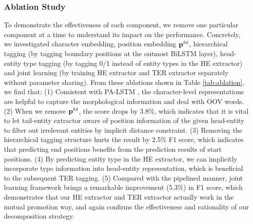 \documentclass{ecai}
\begin{document}
 
 
 \subsubsection{Ablation Study}
 
 

  To demonstrate the effectiveness of each component, we remove one particular component at a time to understand its impact on the performance. Concretely, we investigated character embedding, position embedding $\boldsymbol{\rm{p}}^{ht}$, hierarchical tagging (by tagging boundary positions at the outmost BiLSTM layer), head-entity type tagging (by tagging 0/1 instead of entity types in the HE extractor) and joint learning (by training HE extractor and TER extractor separately without parameter sharing).
  From these ablations shown in Table \ref{tab:ablation}, we find that: 
 (1) Consistent with PA-LSTM \cite{dai2019joint}, the character-level representations are helpful to capture the morphological information and deal with OOV words.
(2) When we remove $\boldsymbol{\rm{p}}^{ht}$, the score drops by 3.8\%, which indicates that it is vital to let tail-entity extractor aware of position information of the given head-entity to filter out irrelevant entities by implicit distance constraint. 
  (3) Removing the hierarchical tagging structure hurts the result by 2.5\% F1 score, which indicates that predicting end positions benefits from the prediction results of start positions. 
  (4) By predicting entity type in the HE extractor, we can implicitly incorporate type information into head-entity representation, which is beneficial to the subsequent TER tagging. 
  (5) Compared with the pipelined manner, joint learning framework brings a remarkable improvement (5.3\%) in F1 score, which demonstrates that our HE extractor and TER extractor actually work in the mutual promotion way, and again confirms the effectiveness and rationality of our decomposition strategy.
  
  


  
















  
\end{document}
